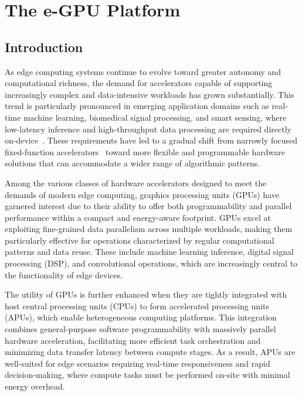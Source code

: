 \chapter{The e-GPU Platform}

    \section{Introduction}
    
        As edge computing systems continue to evolve toward greater autonomy and computational richness, the demand for accelerators capable of supporting increasingly complex and data-intensive workloads has grown substantially. This trend is particularly pronounced in emerging application domains such as real-time machine learning, biomedical signal processing, and smart sensing, where low-latency inference and high-throughput data processing are required directly on-device~\cite{co-design_vision}. These requirements have led to a gradual shift from narrowly focused fixed-function accelerators~\cite{asip, fft, cnn-accel} toward more flexible and programmable hardware solutions that can accommodate a wider range of algorithmic patterns.
    
        Among the various classes of hardware accelerators designed to meet the demands of modern edge computing, graphics processing units (GPUs) have garnered interest due to their ability to offer both programmability and parallel performance within a compact and energy-aware footprint. GPUs excel at exploiting fine-grained data parallelism across multiple workloads, making them particularly effective for operations characterized by regular computational patterns and data reuse. These include machine learning inference, digital signal processing (DSP), and convolutional operations, which are increasingly central to the functionality of edge devices.
    
        The utility of GPUs is further enhanced when they are tightly integrated with host central processing units (CPUs) to form accelerated processing units (APUs), which enable heterogeneous computing platforms. This integration combines general-purpose software programmability with massively parallel hardware acceleration, facilitating more efficient task orchestration and minimizing data transfer latency between compute stages. As a result, APUs are well-suited for edge scenarios requiring real-time responsiveness and rapid decision-making, where compute tasks must be performed on-site with minimal energy overhead.
    
